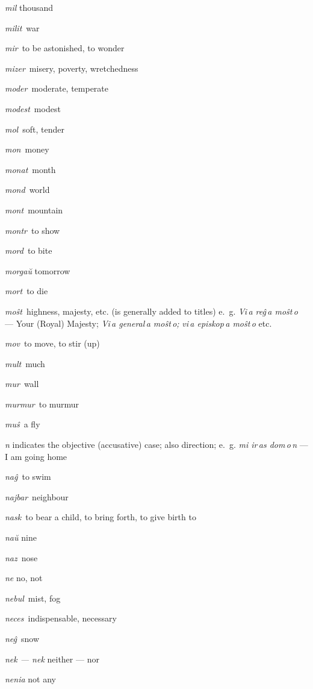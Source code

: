 \begin{landscape}
\begin{multicols}{5}
\begin{outdent}{1em}
\emph{mil} thousand

\emph{milit\,} war

\emph{mir\,} to be astonished, to wonder

\emph{mizer\,} misery, poverty, wretchedness

\emph{moder\,} moderate, temperate

\emph{modest\,} modest

\emph{mol\,} soft, tender

\emph{mon\,} money

\emph{monat\,} month

\emph{mond\,} world

\emph{mont\,} mountain

\emph{montr\,} to show

\emph{mord\,} to bite

\emph{morgaŭ} tomorrow

\emph{mort\,} to die

\emph{moŝt\,} highness, majesty, etc. (is generally added to titles) e.~g. \emph{Vi\,a reĝ\,a moŝt\,o} — Your (Royal) Majesty; \emph{Vi\,a general\,a moŝt\,o;} \emph{vi\,a episkop\,a moŝt\,o} etc.

\emph{mov\,} to move, to stir (up)

\emph{mult\,} much

\emph{mur\,} wall

\emph{murmur\,} to murmur

\emph{muŝ\,} a fly
\end{outdent}


\begin{outdent}{1em}
\emph{n} indicates the objective (accusative) case; also direction; e.~g. \emph{mi ir\,as dom\,o\,n} — I am going home

\emph{naĝ\,} to swim

\emph{najbar\,} neighbour

\emph{nask\,} to bear a child, to bring forth, to give birth to

\emph{naŭ} nine

\emph{naz\,} nose

\emph{ne} no, not

\emph{nebul\,} mist, fog

\emph{neces\,} indispensable, necessary

\emph{neĝ\,} snow

\emph{nek — nek} neither — nor

\emph{nenia} not any


\end{outdent}
\end{multicols}
\end{landscape}
